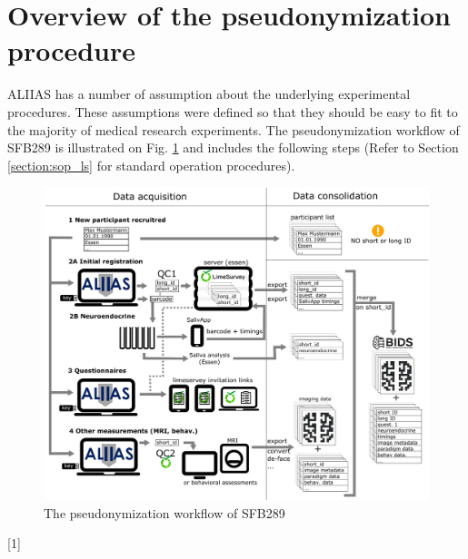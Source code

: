 \section{Overview of the pseudonymization procedure}
ALIIAS has a number of assumption about the underlying experimental procedures. These assumptions were defined so that they should be easy to fit to the majority of medical research experiments. The pseudonymization workflow of SFB289 is illustrated on Fig. \ref{fig:flowchart} and includes the following steps (Refer to Section \ref{section:sop_ls} for standard operation procedures).

\begin{figure}[H]
\centering
\includegraphics[width=1.0\textwidth]{docs/fig/overview_v3.eps}
\caption{The pseudonymization workflow of SFB289}
\label{fig:flowchart}
\end{figure}

[1]

